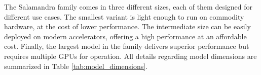 The Salamandra family comes in three different sizes, each of them designed for different use cases. The smallest variant is light enough to run on commodity hardware, at the cost of lower performance. The intermediate size can be easily deployed on modern accelerators, offering a high performance at an affordable cost. Finally, the largest model in the family delivers superior performance but requires multiple GPUs for operation. All details regarding model dimensions are summarized in Table \ref{tab:model_dimensions}.

